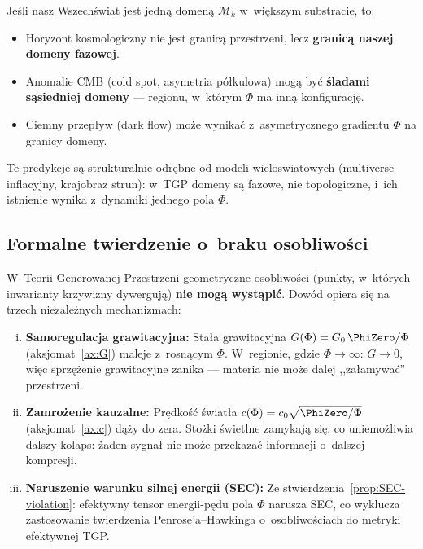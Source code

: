 \begin{remark}
Je\'sli nasz Wszech\'swiat jest jedn\k{a} domen\k{a} $\mathcal{M}_k$
w~wi\k{e}kszym substracie, to:
\begin{itemize}[nosep]
  \item Horyzont kosmologiczny nie jest granic\k{a} przestrzeni,
        lecz \textbf{granic\k{a} naszej domeny fazowej}.
  \item Anomalie CMB (cold spot, asymetria p\'o\l{}kulowa)
        mog\k{a} by\'c \textbf{\'sladami s\k{a}siedniej domeny} ---
        regionu, w~kt\'orym $\Phi$ ma inn\k{a} konfiguracj\k{e}.
  \item Ciemny przep\l{}yw (dark flow) mo\.ze wynika\'c
        z~asymetrycznego gradientu $\Phi$ na granicy domeny.
\end{itemize}
Te predykcje s\k{a} strukturalnie odr\k{e}bne od modeli
wieloswiatowych (multiverse inflacyjny, krajobraz strun):
w~TGP domeny s\k{a} fazowe, nie topologiczne, i~ich istnienie
wynika z~dynamiki jednego pola $\Phi$.
\end{remark}

\subsection{Formalne twierdzenie o~braku osobliwo\'sci}\label{ssec:no-singularity}

\begin{theorem}\label{thm:no-singularity}
W~Teorii Generowanej Przestrzeni geometryczne osobliwo\'sci
(punkty, w~kt\'orych inwarianty krzywizny dywerguj\k{a})
\textbf{nie mog\k{a} wyst\k{a}pi\'c}. Dow\'od opiera si\k{e}
na trzech niezale\.znych mechanizmach:

\begin{enumerate}[(i)]
  \item \textbf{Samoregulacja grawitacyjna:}
    Sta\l{}a grawitacyjna $G(\Phi) = G_0\,\PhiZero/\Phi$
    (aksjomat~\ref{ax:G}) maleje z~rosn\k{a}cym $\Phi$.
    W~regionie, gdzie $\Phi \to \infty$:
    $G \to 0$, wi\k{e}c sprz\k{e}\.zenie grawitacyjne zanika
    --- materia nie mo\.ze dalej ,,za\l{}amywa\'c'' przestrzeni.

  \item \textbf{Zamro\.zenie kauzalne:}
    Pr\k{e}dko\'s\'c \'swiat\l{}a $c(\Phi) = c_0\sqrt{\PhiZero/\Phi}$
    (aksjomat~\ref{ax:c}) d\k{a}\.zy do zera.
    Sto\.zki \'swietlne zamykaj\k{a} si\k{e}, co uniemo\.zliwia
    dalszy kolaps: \.zaden sygna\l{} nie mo\.ze przekaza\'c
    informacji o~dalszej kompresji.

  \item \textbf{Naruszenie warunku silnej energii (SEC):}
    Ze stwierdzenia~\ref{prop:SEC-violation}:
    efektywny tensor energii-p\k{e}du pola $\Phi$ narusza SEC,
    co wyklucza zastosowanie twierdzenia Penrose'a--Hawkinga
    o~osobliwo\'sciach do metryki efektywnej TGP.
\end{enumerate}
\end{theorem}

